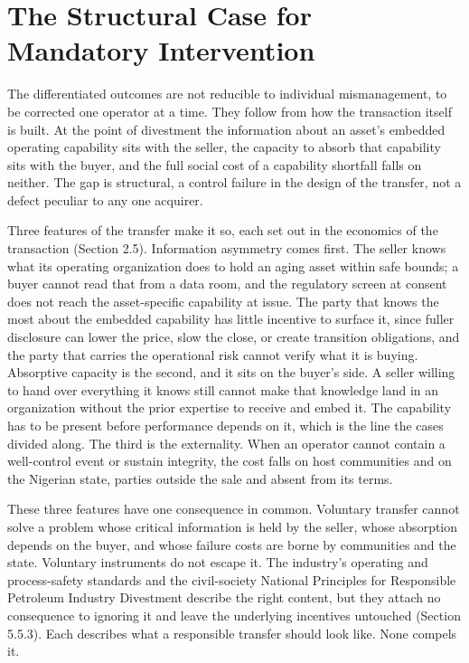 \documentclass[twoside,fontset=lmodern]{mitthesis}
\begin{document}
\hypertarget{the-structural-case-for-mandatory-intervention}{%
\section{The Structural Case for Mandatory
Intervention}\label{the-structural-case-for-mandatory-intervention}}

The differentiated outcomes are not reducible to individual
mismanagement, to be corrected one operator at a time. They follow from
how the transaction itself is built. At the point of divestment the
information about an asset's embedded operating capability sits with the
seller, the capacity to absorb that capability sits with the buyer, and
the full social cost of a capability shortfall falls on neither. The gap
is structural, a control failure in the design of the transfer, not a
defect peculiar to any one acquirer.

Three features of the transfer make it so, each set out in the economics
of the transaction (Section 2.5). Information asymmetry comes first. The
seller knows what its operating organization does to hold an aging asset
within safe bounds; a buyer cannot read that from a data room, and the
regulatory screen at consent does not reach the asset-specific
capability at issue. The party that knows the most about the embedded
capability has little incentive to surface it, since fuller disclosure
can lower the price, slow the close, or create transition obligations,
and the party that carries the operational risk cannot verify what it is
buying. Absorptive capacity is the second, and it sits on the buyer's
side. A seller willing to hand over everything it knows still cannot
make that knowledge land in an organization without the prior expertise
to receive and embed it. The capability has to be present before
performance depends on it, which is the line the cases divided along.
The third is the externality. When an operator cannot contain a
well-control event or sustain integrity, the cost falls on host
communities and on the Nigerian state, parties outside the sale and
absent from its terms.

These three features have one consequence in common. Voluntary transfer
cannot solve a problem whose critical information is held by the seller,
whose absorption depends on the buyer, and whose failure costs are borne
by communities and the state. Voluntary instruments do not escape it.
The industry's operating and process-safety standards and the
civil-society National Principles for Responsible Petroleum Industry
Divestment describe the right content, but they attach no consequence to
ignoring it and leave the underlying incentives untouched (Section
5.5.3). Each describes what a responsible transfer should look like.
None compels it.
\end{document}
